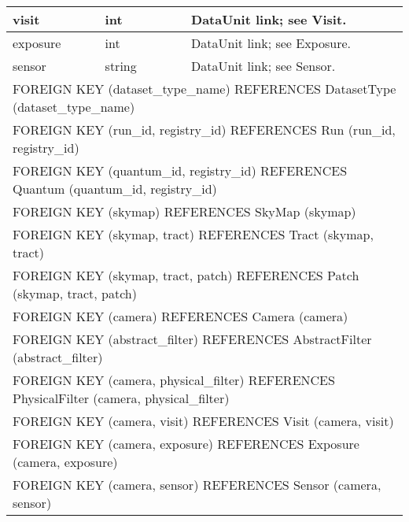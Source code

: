 \begin{tabular}{| l | l | l | p{} |}
\hline
  visit & int &  &
    DataUnit link; see Visit.
    \\
\hline
  exposure & int &  &
    DataUnit link; see Exposure.
    \\
\hline
  sensor & string &  &
    DataUnit link; see Sensor.
    \\
\hline
  \multicolumn{4}{|l|}{FOREIGN KEY (dataset\_type\_name) REFERENCES DatasetType (dataset\_type\_name)} \\
  \multicolumn{4}{|l|}{FOREIGN KEY (run\_id, registry\_id) REFERENCES Run (run\_id, registry\_id)} \\
  \multicolumn{4}{|l|}{FOREIGN KEY (quantum\_id, registry\_id) REFERENCES Quantum (quantum\_id, registry\_id)} \\
  \multicolumn{4}{|l|}{FOREIGN KEY (skymap) REFERENCES SkyMap (skymap)} \\
  \multicolumn{4}{|l|}{FOREIGN KEY (skymap, tract) REFERENCES Tract (skymap, tract)} \\
  \multicolumn{4}{|l|}{FOREIGN KEY (skymap, tract, patch) REFERENCES Patch (skymap, tract, patch)} \\
  \multicolumn{4}{|l|}{FOREIGN KEY (camera) REFERENCES Camera (camera)} \\
  \multicolumn{4}{|l|}{FOREIGN KEY (abstract\_filter) REFERENCES AbstractFilter (abstract\_filter)} \\
  \multicolumn{4}{|l|}{FOREIGN KEY (camera, physical\_filter) REFERENCES PhysicalFilter (camera, physical\_filter)} \\
  \multicolumn{4}{|l|}{FOREIGN KEY (camera, visit) REFERENCES Visit (camera, visit)} \\
  \multicolumn{4}{|l|}{FOREIGN KEY (camera, exposure) REFERENCES Exposure (camera, exposure)} \\
  \multicolumn{4}{|l|}{FOREIGN KEY (camera, sensor) REFERENCES Sensor (camera, sensor)} \\
\hline
\end{tabular}
